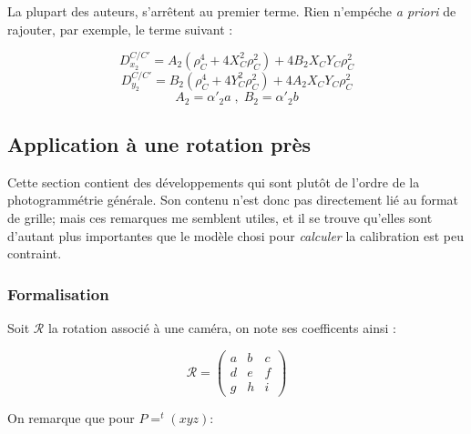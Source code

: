 La plupart des auteurs, s'arr\^etent au premier terme. Rien n'emp\'eche \emph{a priori}
de rajouter, par exemple, le terme suivant :

\begin{equation}
   D^{C/C'}_{x_2} =   A_2 (\rho_C^4+4X_C^2\rho_C^2) + 4 B_2 X_C Y_C\rho_C^2
\end{equation}
\begin{equation}
   D^{C/C'}_{y_2} =   B_2 (\rho_C^4+4Y_C^2\rho_C^2) + 4 A_2 X_C Y_C\rho_C^2
\end{equation}
\begin{equation}
    A_2=\alpha'_2a  \; , \; B_2=\alpha'_2b
\end{equation}




\subsection{Application \`a une rotation pr\`es}

\label{Appl:Rot:Pres}

Cette section contient des d\'eveloppements qui sont plut\^ot de
l'ordre de la photogramm\'etrie g\'en\'erale. 
Son contenu n'est donc pas directement li\'e 
au format de grille; mais ces remarques me semblent utiles,
et il se trouve qu'elles sont d'autant plus importantes 
que le mod\`ele chosi pour \emph{calculer}
la calibration est peu contraint.

\subsubsection{Formalisation}

\label{DIST:ROT:PRES}


Soit $\mathcal{R}$ la  rotation associ\'e \`a une cam\'era, on note
ses coefficents ainsi :

\begin{equation}
\mathcal{R} =\begin{pmatrix} a & b & c \\ d & e & f \\ g & h & i \end{pmatrix}
\end{equation}

On remarque que pour $P=^t(x y z)$:

